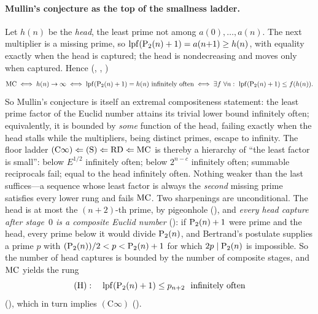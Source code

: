 \paragraph{Mullin's conjecture as the top of the smallness ladder.}
Let $h(n)$ be the \emph{head}, the least prime not among
$a(0),\dots,a(n)$.  The next multiplier is a missing prime, so
$\operatorname{lpf}(\mathrm{P}_{2}(n)+1) = a(n{+}1) \geq h(n)$, with equality exactly when the
head is captured; the head is nondecreasing and moves only when captured.
Hence (,
,
)
\[
  \mathrm{MC}
  \;\Longleftrightarrow\; h(n) \to \infty
  \;\Longleftrightarrow\; \operatorname{lpf}(\mathrm{P}_{2}(n)+1) = h(n) \text{ infinitely often}
  \;\Longleftrightarrow\; \exists f\ \forall n:\ \operatorname{lpf}(\mathrm{P}_{2}(n)+1) \leq f(h(n)).
\]
So Mullin's conjecture is itself an extremal compositeness statement: the
least prime factor of the Euclid number attains its trivial lower bound
infinitely often; equivalently, it is bounded by \emph{some} function of
the head, failing exactly when the head stalls while the multipliers,
being distinct primes, escape to infinity.  The floor ladder
$(\mathrm{C}\infty) \Leftarrow (\mathrm{S}) \Leftarrow \mathrm{RD}
\Leftarrow \mathrm{MC}$ is thereby a hierarchy of ``the least factor is small'':
below $E^{1/2}$ infinitely often; below $2^{n-c}$ infinitely often;
summable reciprocals fail; equal to the head infinitely often.  Nothing
weaker than the last suffices---a sequence whose least factor is always the
\emph{second} missing prime satisfies every lower rung and fails $\mathrm{MC}$.
Two sharpenings are unconditional.  The head is at most the $(n{+}2)$-th
prime, by pigeonhole
(), and
\emph{every head capture after stage~$0$ is a composite Euclid number}
(): if
$\mathrm{P}_{2}(n)+1$ were prime and the head, every prime below it would divide
$\mathrm{P}_{2}(n)$, and Bertrand's postulate supplies a prime $p$ with
$(\mathrm{P}_{2}(n))/2 < p < \mathrm{P}_{2}(n)+1$ for which $2p \mid \mathrm{P}_{2}(n)$ is
impossible.  So the number of head captures is bounded by the number of
composite stages, and $\mathrm{MC}$ yields the rung
\[
  (\mathrm{H}):\quad \operatorname{lpf}(\mathrm{P}_{2}(n)+1) \leq p_{n+2}
  \ \text{ infinitely often}
\]
(),
which in turn implies $(\mathrm{C}\infty)$
().
